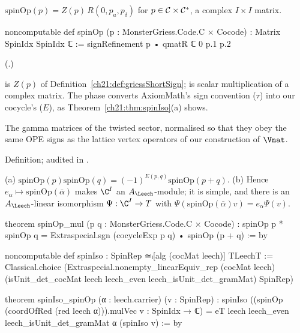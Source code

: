 \begin{definition}\label{ch21:def:spinOp}
$\mathrm{spinOp}(p)=Z(p)\,R(0,p_a,p_\delta)$ for $p\in\mathcal{C}\times\mathcal{C}^*$, a complex $I\times I$ matrix.
\end{definition}
\begin{leancode}
noncomputable def spinOp (p : MonsterGriess.Code.C × Cocode) : Matrix SpinIdx SpinIdx ℂ :=
  signRefinement p • qmatR ℂ 0 p.1 p.2
\end{leancode}
(.)
\begin{dictionary}
 is $Z(p)$ of Definition~\ref{ch21:def:griessShortSign};  is scalar
multiplication of a complex matrix.  The phase converts AxiomMath's sign convention
($\tau$) into our cocycle's ($E$), as Theorem~\ref{ch21:thm:spinIso}(a) shows.
\end{dictionary}
\begin{physics}
The gamma matrices of the twisted sector, normalised so that they obey the same OPE signs as the
lattice vertex operators of our construction of $\Vnat$.
\end{physics}
\begin{status}
Definition; audited in .
\end{status}
\begin{theorem}[$\C^I$ is $T$]\label{ch21:thm:spinIso}
(a) $\mathrm{spinOp}(p)\mathrm{spinOp}(q)=(-1)^{E(p,q)}\mathrm{spinOp}(p+q)$.  (b) Hence
$e_\alpha\mapsto\mathrm{spinOp}(\bar\alpha)$ makes $\C^I$ an $A_\Leech$-module; it is simple, and there is an
$A_\Leech$-linear isomorphism $\Psi:\C^I\to T$ with $\Psi(\mathrm{spinOp}(\bar\alpha)v)=e_\alpha\Psi(v)$.
\end{theorem}
\begin{leancode}
theorem spinOp_mul (p q : MonsterGriess.Code.C × Cocode) :
    spinOp p * spinOp q = Extraspecial.sgn (cocycleExp p q) • spinOp (p + q) := by
\end{leancode}
\begin{leancode}
noncomputable def spinIso : SpinRep ≃ₗ[alg (cocMat leech)] TLeechT :=
  Classical.choice (Extraspecial.nonempty_linearEquiv_rep (cocMat leech)
    (isUnit_det_cocMat leech leech_even leech_isUnit_det_gramMat) SpinRep)
\end{leancode}
\begin{leancode}
theorem spinIso_spinOp (α : leech.carrier) (v : SpinRep) :
    spinIso ((spinOp (coordOfRed (red leech α))).mulVec v : SpinIdx → ℂ)
      = eT leech leech_even leech_isUnit_det_gramMat α (spinIso v) := by
\end{leancode}
